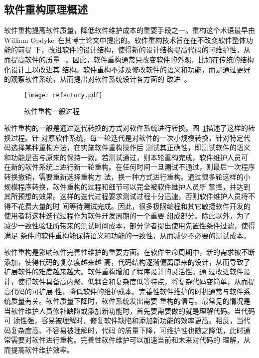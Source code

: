 \subsection{软件重构原理概述}

软件重构提高软件质量，降低软件维护成本的重要手段之一。重构这个术语最早由William
Opdyke~\cite{opdyke1992refactoring}在其博士论文中提出的。软件重构技术旨在在不改变软件整体功能的前提
下，改进软件的设计结构，使得新的设计结构提高代码的可维护性，从而提高软件的质量
~\cite{fowler1999refactoring}。因此，软件重构通常只改变软件的外观，比如在传统的结构化设计上以改进其
结构。软件重构不涉及修改软件的语义和功能，而是通过更好的观察软件系统，从而提出对软件系统设计各方面的
改进~\cite{chikofsky1990reverse}。

\begin{figure}
  \centering
  \texttt{[image: refactory.pdf]}  
  \caption{\label{fig:refactory}软件重构一般过程}
\end{figure}

软件重构的一般是通过迭代转换的方式对软件系统进行转换。图~\ref{fig:refactory}描述了这样的转换过程。针
对原软件系统，每一轮迭代是对软件的一次小规模转换，针对特定代码选择某种重构方法，在实施软件重构操作后
测试其正确性，即测试软件的语义和功能是否与原来的保持一致。若测试通过，则本轮重构完成，软件维护人员可
在新的软件系统上进行新一轮重构。在任何时间一旦测试不通过，则最后一次程序转换撤销，需要重新选择重构方
法，换一种方式进行重构。通过很多轮这样的小规模程序转换，软件重构的过程和细节可以完全被软件维护人员所
掌控，并达到其所预想的效果。这样的迭代过程要求测试过程十分迅速，否则软件维护人员将不得不花费大量的时
间等待测试完成。因此，很多极限编程和其它敏捷软件开发的使用者将这种迭代过程作为软件开发周期的一个重要
组成部分。除此以外，为了减少一致性验证所带来的测试时间成本，部分学者提出使用先置性条件过滤，使得满足
条件的软件重构能保持语义和功能的一致性，从而减少不必要的测试成本。

软件重构是影响软件完善性维护的重要方面。在软件生命周期中，新的需求被不断添加，使得代码的复杂度越来越
高，代码结构逐渐偏离原来的设计，从而导致了扩展软件的难度越来越大。软件重构增加了程序设计的灵活性，通
过改进软件设计，使得软件具备高内聚、低耦合和复杂度低等特点，将复杂代码变简单，从而提高代码的可扩展
性，降低软件的维护成本。完善性软件维护的时机通常与软件系统质量有关。软件质量下降时，软件系统发出需要
重构的信号。最常见的情况是当软件维护人员修补缺陷或添加新功能时，首先要需要做的就是理解代码。当代码可
读性强，容易被理解时，修复软件缺陷和添加新功能的效率更高。相反，当代码复杂度高、不容易被理解时，代码
的质量下降，可维护性也随之降低，此时通常需要对软件进行重构。完善性软件维护可以加速当前和未来对代码的
理解，从而提高软件维护效率。

